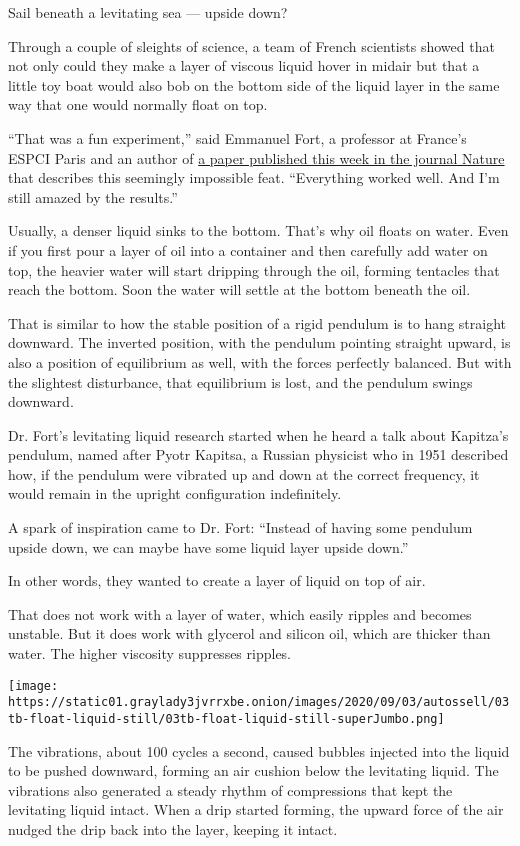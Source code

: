 Sail beneath a levitating sea --- upside down?

Through a couple of sleights of science, a team of French scientists
showed that not only could they make a layer of viscous liquid hover in
midair but that a little toy boat would also bob on the bottom side of
the liquid layer in the same way that one would normally float on top.

``That was a fun experiment,'' said Emmanuel Fort, a professor at
France's ESPCI Paris and an author of
\href{https://www.nature.com/articles/s41586-020-2643-8}{a paper
published this week in the journal Nature} that describes this seemingly
impossible feat. ``Everything worked well. And I'm still amazed by the
results.''

Usually, a denser liquid sinks to the bottom. That's why oil floats on
water. Even if you first pour a layer of oil into a container and then
carefully add water on top, the heavier water will start dripping
through the oil, forming tentacles that reach the bottom. Soon the water
will settle at the bottom beneath the oil.

That is similar to how the stable position of a rigid pendulum is to
hang straight downward. The inverted position, with the pendulum
pointing straight upward, is also a position of equilibrium as well,
with the forces perfectly balanced. But with the slightest disturbance,
that equilibrium is lost, and the pendulum swings downward.

Dr. Fort's levitating liquid research started when he heard a talk about
Kapitza's pendulum, named after Pyotr Kapitsa, a Russian physicist who
in 1951 described how, if the pendulum were vibrated up and down at the
correct frequency, it would remain in the upright configuration
indefinitely.

A spark of inspiration came to Dr. Fort: ``Instead of having some
pendulum upside down, we can maybe have some liquid layer upside down.''

In other words, they wanted to create a layer of liquid on top of air.

That does not work with a layer of water, which easily ripples and
becomes unstable. But it does work with glycerol and silicon oil, which
are thicker than water. The higher viscosity suppresses ripples.

\texttt{[image: https://static01.graylady3jvrrxbe.onion/images/2020/09/03/autossell/03tb-float-liquid-still/03tb-float-liquid-still-superJumbo.png]}

The vibrations, about 100 cycles a second, caused bubbles injected into
the liquid to be pushed downward, forming an air cushion below the
levitating liquid. The vibrations also generated a steady rhythm of
compressions that kept the levitating liquid intact. When a drip started
forming, the upward force of the air nudged the drip back into the
layer, keeping it intact.


